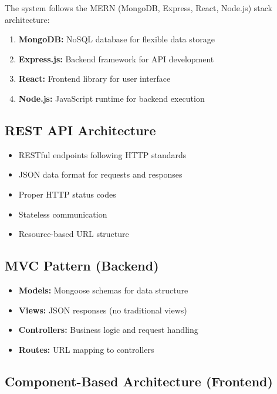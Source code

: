 \documentclass[12pt,a4paper]{report}
\begin{document}
The system follows the MERN (MongoDB, Express, React, Node.js) stack architecture:

\begin{enumerate}[leftmargin=*]
    \item \textbf{MongoDB:} NoSQL database for flexible data storage
    \item \textbf{Express.js:} Backend framework for API development
    \item \textbf{React:} Frontend library for user interface
    \item \textbf{Node.js:} JavaScript runtime for backend execution
\end{enumerate}

\subsection{REST API Architecture}

\begin{itemize}[leftmargin=*]
    \item RESTful endpoints following HTTP standards
    \item JSON data format for requests and responses
    \item Proper HTTP status codes
    \item Stateless communication
    \item Resource-based URL structure
\end{itemize}

\subsection{MVC Pattern (Backend)}

\begin{itemize}[leftmargin=*]
    \item \textbf{Models:} Mongoose schemas for data structure
    \item \textbf{Views:} JSON responses (no traditional views)
    \item \textbf{Controllers:} Business logic and request handling
    \item \textbf{Routes:} URL mapping to controllers
\end{itemize}

\subsection{Component-Based Architecture (Frontend)}
\end{document}
